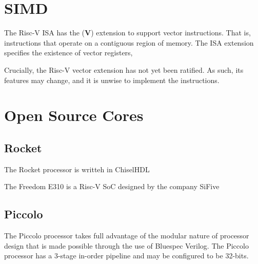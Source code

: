 \documentclass[a4paper,8pt]{report}
\begin{document}


\section{SIMD}
The Risc-V ISA has the (\textbf{V}) extension to support vector instructions.
That is, instructions that operate on a contiguous region of memory. The ISA
extension specifies the existence of vector registers, 

Crucially, the Risc-V vector extension has not yet been ratified. As such, its
features may change, and it is unwise to implement the instructions.


\section{Open Source Cores}

\subsection{Rocket}
The Rocket processor is writteh in ChiselHDL

The Freedom E310 is a Risc-V SoC designed by the company SiFive

\subsection{Piccolo}

The Piccolo processor takes full advantage of the modular nature of processor
design that is made possible through the use of Bluespec Verilog. 
The Piccolo processor has a 3-stage in-order pipeline and may be configured to be 32-bits.




\end{document}
